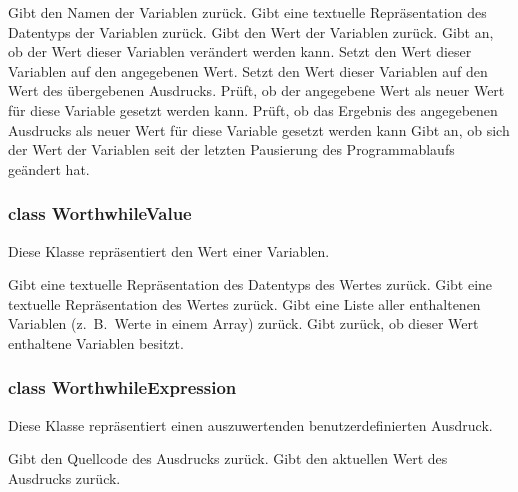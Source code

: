 \begin{description}
	 Gibt den Namen der Variablen zurück.
	 Gibt eine textuelle Repräsentation des Datentyps der Variablen zurück.
	 Gibt den Wert der Variablen zurück.
	 Gibt an, ob der Wert dieser Variablen verändert werden kann.
	 Setzt den Wert dieser Variablen auf den angegebenen Wert.
	 Setzt den Wert dieser Variablen auf den Wert des übergebenen Ausdrucks.
	 Prüft, ob der angegebene Wert als neuer Wert für diese Variable gesetzt werden kann.
	 Prüft, ob das Ergebnis des angegebenen Ausdrucks als neuer Wert für diese Variable gesetzt werden kann
	 Gibt an, ob sich der Wert der Variablen seit der letzten Pausierung des Programmablaufs geändert hat.
\end{description}

\subsubsection{class WorthwhileValue}

Diese Klasse repräsentiert den Wert einer Variablen.

\begin{description}
	 Gibt eine textuelle Repräsentation des Datentyps des Wertes zurück.
	 Gibt eine textuelle Repräsentation des Wertes zurück.
	 Gibt eine Liste aller enthaltenen Variablen (z.~B.\ Werte in einem Array) zurück.
	 Gibt zurück, ob dieser Wert enthaltene Variablen besitzt.
\end{description}

\subsubsection{class WorthwhileExpression}

Diese Klasse repräsentiert einen auszuwertenden benutzerdefinierten Ausdruck.

\begin{description}
	 Gibt den Quellcode des Ausdrucks zurück.
	 Gibt den aktuellen Wert des Ausdrucks zurück.
\end{description}

